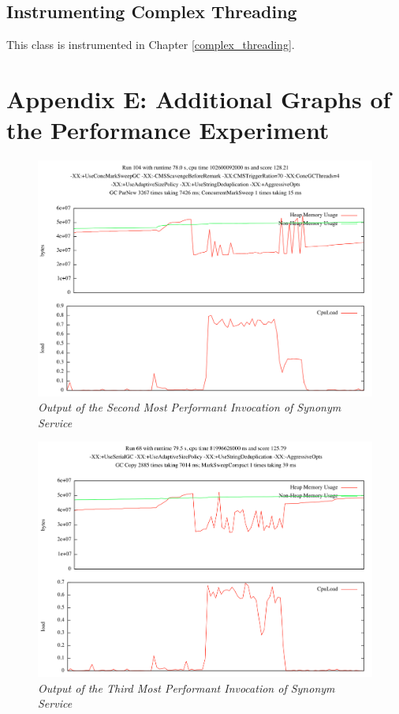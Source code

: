 \documentclass[]{final_report}
\begin{document}
\section*{Instrumenting Complex Threading}

This class is instrumented in Chapter \ref{complex_threading}.
\newpage

\chapter*{Appendix E: Additional Graphs of the Performance Experiment}

\begin{figure}[!h]
\begin{center}
\includegraphics[scale=0.4]{figures/gplot_2.png}
\caption*{\small \sl Output of the Second Most Performant Invocation of Synonym Service}
\end{center} 
\end{figure}

\begin{figure}[!h]
\begin{center}
\includegraphics[scale=0.4]{figures/gplot_3.png}
\caption*{\small \sl Output of the Third Most Performant Invocation of Synonym Service}
\end{center} 
\end{figure}
\end{document}

